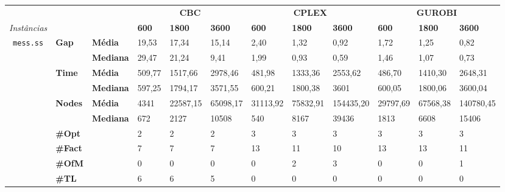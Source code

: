 
	\begin{footnotesize}	
	\caption{}
	\label{cflp:tab:4}
	\begin{tabular}{c@{\hskip 0.2cm}l@{\hskip 0.1cm}l|lll|lll|lll}
	& & & \multicolumn{3}{c}{\textbf{CBC}} & \multicolumn{3}{c}{\textbf{CPLEX}} & \multicolumn{3}{c}{\textbf{GUROBI}} 	\\\textit{Instâncias} & & & \textbf{600} & \textbf{1800} & \textbf{3600} & \textbf{600} & \textbf{1800} & \textbf{3600} & \textbf{600} & \textbf{1800} & \textbf{3600} \\
\hline
\multirow{7}{*}{\texttt{mess.ss}} & \multirow{2}{*}{\textbf{Gap}} & \textbf{Média} & 19,53 & 17,34 & 15,14 & 2,40 & 1,32 & 0,92 & 1,72 & 1,25 & 0,82 \\
 & & \textbf{Mediana} & 29,47 & 21,24 & 9,41 & 1,99 & 0,93 & 0,59 & 1,46 & 1,07 & 0,73 \\
\cline{2-12}
 & \multirow{2}{*}{\textbf{Time}} & \textbf{Média} & 509,77 & 1517,66 & 2978,46 & 481,98 & 1333,36 & 2553,62 & 486,70 & 1410,30 & 2648,31 \\
 & & \textbf{Mediana} & 597,25 & 1794,17 & 3571,55 & 600,21 & 1800,38 & 3601 & 600,05 & 1800,06 & 3600,04 \\
\cline{2-12}
 & \multirow{2}{*}{\textbf{Nodes}} & \textbf{Média} & 4341 & 22587,15 & 65098,17 & 31113,92 & 75832,91 & 154435,20 & 29797,69 & 67568,38 & 140780,45 \\
 & & \textbf{Mediana} & 672 & 2127 & 10508 & 540 & 8167 & 39436 & 1813 & 6608 & 15406 \\
\cline{2-12}
 & \textbf{\#Opt} & & 2 & 2 & 2 & 3 & 3 & 3 & 3 & 3 & 3 \\
 & \textbf{\#Fact} & & 7 & 7 & 7 & 13 & 11 & 10 & 13 & 13 & 11 \\
 & \textbf{\#OfM} & & 0 & 0 & 0 & 0 & 2 & 3 & 0 & 0 & 1 \\
 & \textbf{\#TL} & & 6 & 6 & 5 & 0 & 0 & 0 & 0 & 0 & 0 \\
	\end{tabular}
	\end{footnotesize}

